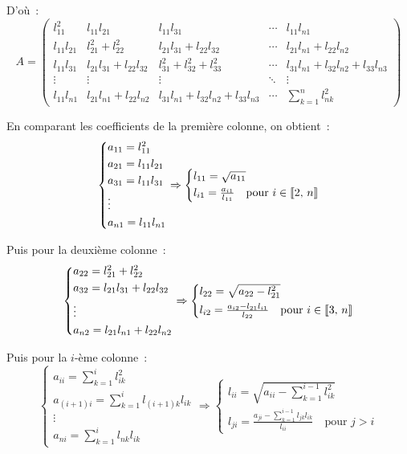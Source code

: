 D'où~:
$$A = \begin{pmatrix}
    l_{11}^2 & l_{11}l_{21} & l_{11}l_{31} & \cdots & l_{11}l_{n1}\\
    l_{11}l_{21} & l_{21}^2 + l_{22}^2 & l_{21}l_{31} + l_{22}l_{32} & \cdots & l_{21}l_{n1} + l_{22}l_{n2}\\
    l_{11}l_{31} & l_{21}l_{31} + l_{22}l_{32} & l_{31}^2 + l_{32}^2 + l_{33}^2 & \cdots & l_{31}l_{n1} + l_{32}l_{n2} + l_{33}l_{n3}\\
    \vdots & \vdots & \vdots & \ddots & \vdots\\
    l_{11}l_{n1} & l_{21}l_{n1} + l_{22}l_{n2} & l_{31}l_{n1} + l_{32}l_{n2} + l_{33}l_{n3} & \cdots & \sum_{k=1}^n l_{nk}^2
\end{pmatrix}$$

En comparant les coefficients de la première colonne, on obtient~:
$$\begin{cases*}
    a_{11} = l_{11}^2\\
    a_{21} = l_{11}l_{21}\\
    a_{31} = l_{11}l_{31}\\
    \vdots\\
    a_{n1} = l_{11}l_{n1}
\end{cases*} \Rightarrow \begin{cases*}
    l_{11} = \sqrt{a_{11}}\\
    l_{i1} = \frac{a_{i1}}{l_{11}} \quad \text{pour } i \in \intint{2}{n}
\end{cases*}$$

Puis pour la deuxième colonne~:
$$\begin{cases*}
    a_{22} = l_{21}^2 + l_{22}^2\\
    a_{32} = l_{21}l_{31} + l_{22}l_{32}\\
    \vdots\\
    a_{n2} = l_{21}l_{n1} + l_{22}l_{n2}
\end{cases*} \Rightarrow \begin{cases*}
    l_{22} = \sqrt{a_{22} - l_{21}^2}\\
    l_{i2} = \frac{a_{i2} - l_{21}l_{i1}}{l_{22}} \quad \text{pour } i \in \intint{3}{n}
\end{cases*}$$

Puis pour la $i$-ème colonne~:
$$\begin{cases*}
    a_{ii} = \sum_{k=1}^i l_{ik}^2\\
    a_{(i+1)i} = \sum_{k=1}^i l_{(i+1)k}l_{ik}\\
    \vdots\\
    a_{ni} = \sum_{k=1}^i l_{nk}l_{ik}
\end{cases*} \Rightarrow \begin{cases*}
    l_{ii} = \sqrt{a_{ii} - \sum_{k=1}^{i-1} l_{ik}^2}\\
    l_{ji} = \frac{a_{ji} - \sum_{k=1}^{i-1} l_{jk}l_{ik}}{l_{ii}} \quad \text{pour } j > i
\end{cases*}$$



